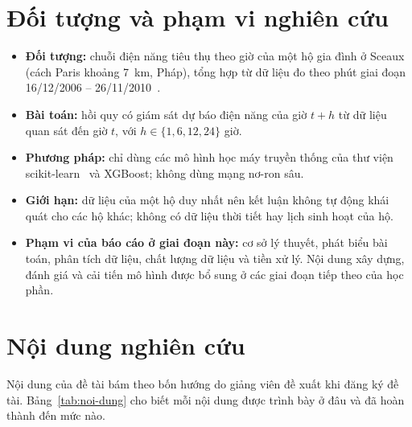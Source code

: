 \documentclass[../main.tex]{subfiles}
\begin{document}
\section*{Đối tượng và phạm vi nghiên cứu}
\begin{itemize}
    \item \textbf{Đối tượng:} chuỗi điện năng tiêu thụ theo giờ của một hộ gia đình ở Sceaux (cách Paris khoảng 7~km, Pháp), tổng hợp từ dữ liệu đo theo phút giai đoạn 16/12/2006 -- 26/11/2010~\cite{hebrail2006uci}.
    \item \textbf{Bài toán:} hồi quy có giám sát dự báo điện năng của giờ $t+h$ từ dữ liệu quan sát đến giờ $t$, với $h \in \{1, 6, 12, 24\}$ giờ.
    \item \textbf{Phương pháp:} chỉ dùng các mô hình học máy truyền thống của thư viện scikit-learn~\cite{pedregosa2011scikit} và XGBoost; không dùng mạng nơ-ron sâu.
    \item \textbf{Giới hạn:} dữ liệu của một hộ duy nhất nên kết luận không tự động khái quát cho các hộ khác; không có dữ liệu thời tiết hay lịch sinh hoạt của hộ.
    \item \textbf{Phạm vi của báo cáo ở giai đoạn này:} cơ sở lý thuyết, phát biểu bài toán, phân tích dữ liệu, chất lượng dữ liệu và tiền xử lý. Nội dung xây dựng, đánh giá và cải tiến mô hình được bổ sung ở các giai đoạn tiếp theo của học phần.
\end{itemize}

\section*{Nội dung nghiên cứu}
Nội dung của đề tài bám theo bốn hướng do giảng viên đề xuất khi đăng ký đề tài. Bảng~\ref{tab:noi-dung} cho biết mỗi nội dung được trình bày ở đâu và đã hoàn thành đến mức nào.
\end{document}
